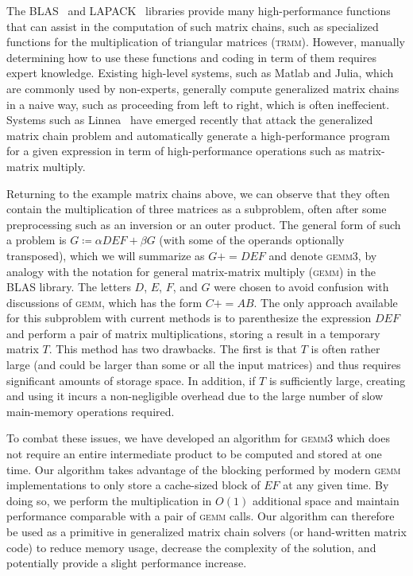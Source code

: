\documentclass[12pt]{article}
\newcommand*{\pluseq}{\mathrel{{+}{=}}}
\newcommand*{\gemmt}{{\textsc{gemm3}}}
\newcommand*{\gemm}{{\textsc{gemm}}}
\newcommand*{\mycite}[1]{~\cite{#1}}
\begin{document}
The BLAS\mycite{blas_standard} and LAPACK\mycite{lapack_ug} libraries provide many high-performance functions that can assist in the computation of such matrix chains, such as specialized functions for the multiplication of triangular matrices (\textsc{trmm}).
However, manually determining how to use these functions and coding in term of them requires expert knowledge.
Existing high-level systems, such as Matlab and Julia, which are commonly used by non-experts, generally compute generalized matrix chains in a naive way, such as proceeding from left to right, which is often ineffecient.
Systems such as Linnea\mycite{Barthels2017} have emerged recently that attack the generalized matrix chain problem and automatically generate a high-performance program for a given expression in term of high-performance operations such as matrix-matrix multiply.

Returning to the example matrix chains above, we can observe that they often contain the multiplication of three matrices as a subproblem, often after some preprocessing such as an inversion or an outer product.
The general form of such a problem is $G \coloneqq \alpha DEF + \beta G$ (with some of the operands optionally transposed), which we will summarize as $G \pluseq DEF$ and denote \gemmt{}, by analogy with the notation for general matrix-matrix multiply (\gemm{}) in the BLAS library.
The letters $D$, $E$, $F$, and $G$ were chosen to avoid confusion with discussions of \gemm{}, which has the form $C \pluseq AB$.
The only approach available for this subproblem with current methods is to parenthesize the expression $DEF$ and perform a pair of matrix multiplications, storing a result in a temporary matrix $T$.
This method has two drawbacks.
The first is that $T$ is often rather large (and could be larger than some or all the input matrices) and thus requires significant amounts of storage space.
In addition, if $T$ is sufficiently large, creating and using it incurs a non-negligible overhead due to the large number of slow main-memory operations required.

To combat these issues, we have developed an algorithm for \gemmt{} which does not require an entire intermediate product to be computed and stored at one time.
Our algorithm takes advantage of the blocking performed by modern \gemm{} implementations to only store a cache-sized block of $EF$ at any given time.
By doing so, we perform the multiplication in $O(1)$ additional space and maintain performance comparable with a pair of \gemm{} calls.
Our algorithm can therefore be used as a primitive in generalized matrix chain solvers (or hand-written matrix code) to reduce memory usage, decrease the complexity of the solution, and potentially provide a slight performance increase.
\end{document}
